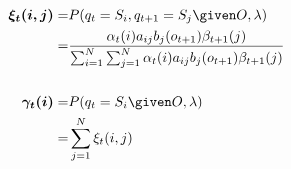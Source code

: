 \begin{align}
\boldsymbol{\xi_t(i, j)} =& P(q_t = S_i, q_{t+1} = S_j \given O, \lambda) \nonumber \\
=& \frac{
  \alpha_t(i) a_{ij} b_j(o_{t+1}) \beta_{t+1}(j) }{
  \sum_{i=1}^N \sum_{j=1}^N \alpha_t(i) a_{ij} b_j(o_{t+1}) \beta_{t+1}(j) }
\label{eq:bw:xi} 
%
\\[\baselineskip]
\boldsymbol{\gamma_t(i)} =& P(q_t = S_i \given O, \lambda) \nonumber \\
=& \sum_{j=1}^N \xi_t(i, j)
\label{eq:bw:gamma}
%
\end{align}
